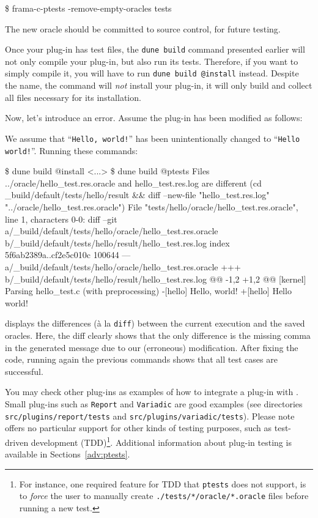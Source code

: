 \begin{shell}
\$ frama-c-ptests -remove-empty-oracles tests
\end{shell}

The new oracle should be committed to source control, for future testing.

\begin{important}
  Once your plug-in has test files, the \verb|dune build| command presented
  earlier will not only compile your plug-in, but also run its tests.
  Therefore, if you want to simply compile it, you will have to run
  \verb|dune build @install| instead. Despite the name, the command will
       {\em not} install your plug-in, it will only build and collect all
       files necessary for its installation.
\end{important}

Now, let's introduce an error. Assume the plug-in has been modified as follows:


We assume that ``\texttt{Hello, world!}'' has been unintentionally changed to
``\texttt{Hello world!}''.
Running these commands:
\begin{shell}[breaklines=true]
\$ dune build @install
<...>
\$ dune build @ptests
Files ../oracle/hello_test.res.oracle and hello_test.res.log are different
 (cd _build/default/tests/hello/result && diff --new-file "hello_test.res.log" "../oracle/hello_test.res.oracle")
File "tests/hello/oracle/hello_test.res.oracle", line 1, characters 0-0:
diff --git a/_build/default/tests/hello/oracle/hello_test.res.oracle b/_build/default/tests/hello/result/hello_test.res.log
index 5f6ab2389a..cf2e5c010c 100644
--- a/_build/default/tests/hello/oracle/hello_test.res.oracle
+++ b/_build/default/tests/hello/result/hello_test.res.log
@@ -1,2 +1,2 @@
 [kernel] Parsing hello_test.c (with preprocessing)
-[hello] Hello, world!
+[hello] Hello world!
\end{shell}
displays the differences (à la \texttt{diff}) between the current execution
and the saved oracles. Here, the diff clearly shows that the only difference is
the missing comma in the generated message due to our (erroneous) modification.
After fixing the \ocaml code, running again the previous commands shows that all
test cases are successful.

You may check other \framac plug-ins as examples of how to integrate a
plug-in with \ptests. Small plug-ins such as \texttt{Report} and
\texttt{Variadic} are good examples (see directories
\texttt{src/plugins/report/tests} and \texttt{src/plugins/variadic/tests}).
Please note \framac offers no particular support for other kinds of testing
purposes, such as test-driven development (TDD)\footnote{For instance, one
required feature for TDD that \texttt{ptests} does not support, is to
{\em force} the user to manually create \texttt{./tests/*/oracle/*.oracle}
files before running a new test.}.
Additional information about plug-in testing is available in
Sections~\ref{adv:ptests}.

